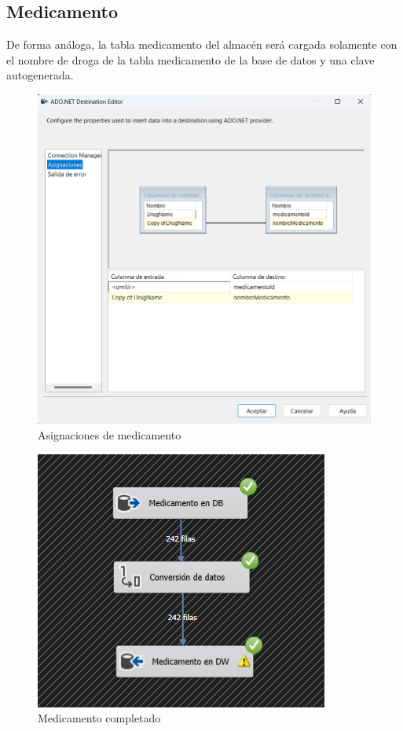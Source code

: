 \documentclass{article}
\begin{document}
	\subsection{Medicamento}
	De forma análoga, la tabla medicamento del almacén será cargada solamente con el nombre de droga de la tabla medicamento  de la base de datos y una clave autogenerada.
	\begin{figure}[H]
		\centering
		\includegraphics[width=.7\linewidth]{./images/asignaciones/medicamento.png}
		\caption{Asignaciones de medicamento}
	\end{figure}
	
	\begin{figure}[H]
		\centering
		\includegraphics[width=.3\linewidth]{./images/completados/medicamento.png}
		\caption{Medicamento completado}
	\end{figure}
\end{document}
